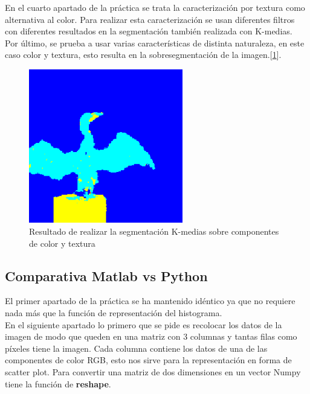 \documentclass[a4paper,12pt]{report}
\begin{document}
En el cuarto apartado de la práctica se trata la caracterización por textura como alternativa al color. Para realizar esta caracterización se usan diferentes filtros con diferentes resultados en la segmentación también realizada con K-medias.\\

Por último, se prueba a usar varias características de distinta naturaleza, en este caso color y textura, esto resulta en la sobresegmentación de la imagen.[\ref{segmentacionabe}].

\begin{figure}[h]
\centering
\includegraphics[width=0.6\textwidth]{imagenes/segmentacionabe}
\caption{Resultado de realizar la segmentación K-medias sobre componentes de color y textura}
\label{segmentacionabe}
\end{figure}

\subsection{Comparativa Matlab vs Python}

El primer apartado de la práctica se ha mantenido idéntico ya que no requiere nada más que la función de representación del histograma.\\

En el siguiente apartado lo primero que se pide es recolocar los datos de la imagen de modo que queden en una matriz con 3 columnas y tantas filas como píxeles tiene la imagen. Cada columna contiene los datos de una de las componentes de color RGB, esto nos sirve para la representación en forma de scatter plot. Para convertir una matriz de dos dimensiones en un vector Numpy tiene la función de \textbf{reshape}. \\
\end{document}
